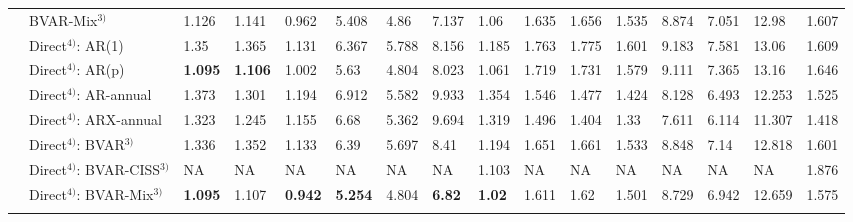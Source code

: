 \begin{table}[!h]
\begin{tabular}[t]{llllllllllllllll}
 & BVAR-Mix$^{3)}$ & 1.126 & 1.141 & 0.962 & 5.408 & 4.86 & 7.137 & 1.06 & 1.635 & 1.656 & 1.535 & 8.874 & 7.051 & 12.98 & 1.607\\
 & Direct$^{4)}$: AR(1) & 1.35 & 1.365 & 1.131 & 6.367 & 5.788 & 8.156 & 1.185 & 1.763 & 1.775 & 1.601 & 9.183 & 7.581 & 13.06 & 1.609\\
 & Direct$^{4)}$: AR(p) & \textbf{1.095} & \textbf{1.106} & 1.002 & 5.63 & 4.804 & 8.023 & 1.061 & 1.719 & 1.731 & 1.579 & 9.111 & 7.365 & 13.16 & 1.646\\
 & Direct$^{4)}$: AR-annual & 1.373 & 1.301 & 1.194 & 6.912 & 5.582 & 9.933 & 1.354 & 1.546 & 1.477 & 1.424 & 8.128 & 6.493 & 12.253 & 1.525\\
 & Direct$^{4)}$: ARX-annual & 1.323 & 1.245 & 1.155 & 6.68 & 5.362 & 9.694 & 1.319 & 1.496 & 1.404 & 1.33 & 7.611 & 6.114 & 11.307 & 1.418\\
 & Direct$^{4)}$: BVAR$^{3)}$ & 1.336 & 1.352 & 1.133 & 6.39 & 5.697 & 8.41 & 1.194 & 1.651 & 1.661 & 1.533 & 8.848 & 7.14 & 12.818 & 1.601\\
 & Direct$^{4)}$: BVAR-CISS$^{3)}$ & NA & NA & NA & NA & NA & NA & 1.103 & NA & NA & NA & NA & NA & NA & 1.876\\
 & Direct$^{4)}$: BVAR-Mix$^{3)}$ & \textbf{1.095} & 1.107 & \textbf{0.942} & \textbf{5.254} & 4.804 & \textbf{6.82} & \textbf{1.02} & 1.611 & 1.62 & 1.501 & 8.729 & 6.942 & 12.659 & 1.575\\
\cellcolor{gray!15}{} & \cellcolor{gray!15}{Simple Ensemble$^{5)}$} & \cellcolor{gray!15}{1.18} & \cellcolor{gray!15}{1.196} & \cellcolor{gray!15}{0.993} & \cellcolor{gray!15}{5.617} & \cellcolor{gray!15}{5.072} & \cellcolor{gray!15}{7.168} & \cellcolor{gray!15}{1.069} & \cellcolor{gray!15}{1.509} & \cellcolor{gray!15}{1.53} & \cellcolor{gray!15}{1.403} & \cellcolor{gray!15}{8.122} & \cellcolor{gray!15}{6.436} & \cellcolor{gray!15}{11.922} & \cellcolor{gray!15}{1.455}\\
\bottomrule
\end{tabular}
\end{table}

